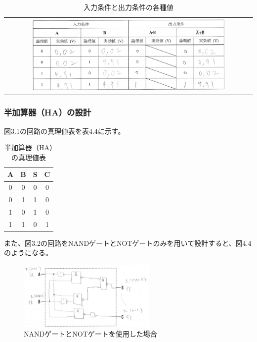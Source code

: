 \documentclass{jlreq}
\numberwithin{equation}{section}
\begin{document}
\begin{enumerate}
  \begin{table}[H]
  \centering
  \caption{入力条件と出力条件の各種値}
  \begin{tabular}{c}
    \includegraphics[width=0.8\textwidth]{assets/notnorshinri.png} \\
  \end{tabular}
  \end{table}

\end{enumerate}

\subsubsection{半加算器（HA）の設計}
図3.1の回路の真理値表を表4.4に示す。

\begin{table}[H]
  \centering
  \caption{半加算器（HA）の真理値表}
  \begin{tabular}{|c|c|c|c|}
    \hline
    A & B & S & C \\ \hline
    0 & 0 & 0 & 0 \\ \hline
    0 & 1 & 1 & 0 \\ \hline
    1 & 0 & 1 & 0 \\ \hline
    1 & 1 & 0 & 1 \\ \hline
  \end{tabular}
\end{table}

また、図3.2の回路をNANDゲートとNOTゲートのみを用いて設計すると、図4.4のようになる。

\begin{figure}[H]
  \centering
  \includegraphics[width=0.6\textwidth]{assets/hanandnot.png}
  \caption{NANDゲートとNOTゲートを使用した場合}
\end{figure}
\end{document}
